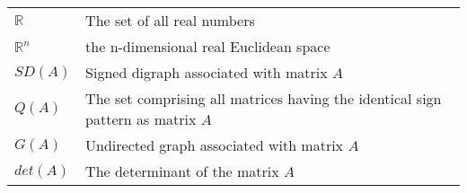 \begin{tabular}{ll}
$\mathbb{R}$ & The set of all real numbers\\
$\mathbb{R}^n$ & the n-dimensional real Euclidean space\\

$SD(A)$ & Signed digraph associated with matrix $A$\\
$Q(A)$ & The set comprising all matrices having the identical sign pattern as matrix $A$\\
$G(A)$ & Undirected graph associated with matrix $A$\\
$det(A)$ & The determinant of the matrix $A$

\end{tabular}
